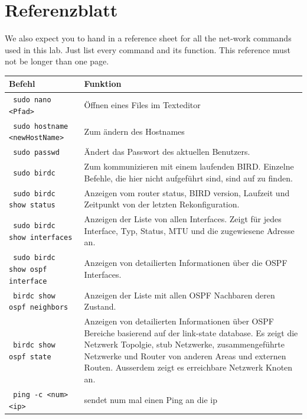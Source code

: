 \documentclass[11pt,titlepage]{article}
\newenvironment{shadedquotation}
 {\begin{shaded*}
  \quoting[leftmargin=0pt, vskip=0pt]
 }
 {\endquoting
 \end{shaded*}
}
\begin{document}
\section{Referenzblatt}
\label{sec:Referenzblatt}
\begin{shadedquotation}
  We also expect you to hand in a reference sheet for all the net-work commands used in this lab. Just list every command and its function. This reference must not be longer than one page.
\end{shadedquotation}

\par\medskip 

\begin{tabular}{ |p{4cm}|p{10cm}|}
  \hline
  \textbf{Befehl} & \textbf{Funktion} \\
  \hline
  \lstinline! sudo nano <Pfad> ! & Öffnen eines Files im Texteditor \\
  \hline
  \lstinline! sudo hostname <newHostName>! & Zum ändern des Hostnames \\
  \hline
  \lstinline! sudo passwd! & Ändert das Passwort des aktuellen Benutzers. \\
  \hline
  \lstinline! sudo birdc ! & Zum kommunizieren mit einem laufenden BIRD. Einzelne Befehle, die hier nicht aufgeführt sind, sind auf \cite{BIRD_COMMAND} zu finden. \\
  \hline
  \lstinline! sudo birdc show status ! & Anzeigen vom router status, BIRD version, Laufzeit und Zeitpunkt von der letzten Rekonfiguration. \\
  \hline
  \lstinline! sudo birdc show interfaces ! & Anzeigen der Liste von allen Interfaces. Zeigt für jedes Interface, Typ, Status, MTU und die zugewiesene Adresse an.\\
  \hline
  \lstinline! sudo birdc show ospf interface ! & Anzeigen von detailierten Informationen über die OSPF Interfaces. \\
  \hline
  \lstinline! birdc show ospf neighbors ! & Anzeigen der Liste mit allen OSPF Nachbaren deren Zustand. \\
  \hline
  \lstinline! birdc show ospf state ! & Anzeigen von detailierten Informationen über OSPF Bereiche basierend auf der link-state database. Es zeigt die Netzwerk Topolgie, stub Netzwerke, zusammengeführte Netzwerke und Router von anderen Areas und externen Routen. Ausserdem zeigt es erreichbare Netzwerk Knoten an. \\
  \hline
  \lstinline! ping -c <num> <ip> ! & sendet num mal einen Ping an  die ip \\

\end{tabular}
\end{document}
